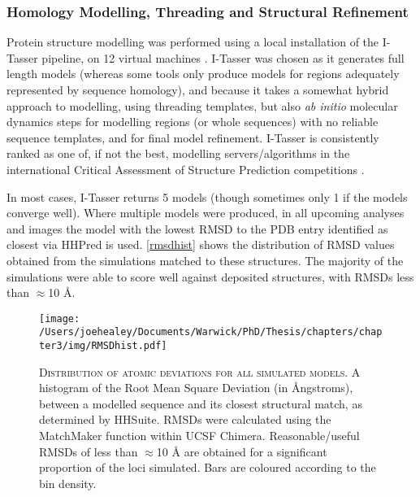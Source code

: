 \subsubsection{Homology Modelling, Threading and Structural Refinement}
Protein structure modelling was performed using a local installation of the I-Tasser pipeline, on 12 virtual machines \citep{Yang2014, Roy2010, Zhang2008}. I-Tasser was chosen as it generates full length models (whereas some tools only produce models for regions adequately represented by sequence homology), and because it takes a somewhat hybrid approach to modelling, using threading templates, but also \emph{ab initio} molecular dynamics steps for modelling regions (or whole sequences) with no reliable sequence templates, and for final model refinement. I-Tasser is consistently ranked as one of, if not the best, modelling servers/algorithms in the international Critical Assessment of Structure Prediction competitions \citep{Moult2015}.

In most cases, I-Tasser returns 5 models (though sometimes only 1 if the models converge well). Where multiple models were produced, in all upcoming analyses and images the model with the lowest RMSD to the PDB entry identified as closest via HHPred is used. \vref{rmsdhist} shows the distribution of RMSD values obtained from the simulations matched to these structures. The majority of the simulations were able to score well against deposited structures, with RMSDs less than $\approx$10 \AA.

\begin{figure}[h]
\centering
{}
\texttt{[image: /Users/joehealey/Documents/Warwick/PhD/Thesis/chapters/chapter3/img/RMSDhist.pdf]}
	\captionsetup{singlelinecheck=off, justification=justified, font=footnotesize, aboveskip=10pt}
	\caption[I-Tasser model accuracy distribution - RMSD]{\textsc{\normalsize Distribution of atomic deviations for all simulated models.}\vspace{0.1cm} \newline A histogram of the Root Mean Square Deviation (in \AA{}ngstroms), between a modelled sequence and its closest structural match, as determined by HHSuite. RMSDs were calculated using the MatchMaker function within UCSF Chimera. Reasonable/useful RMSDs of less than $\approx$10 \AA{} are obtained for a significant proportion of the loci simulated. Bars are coloured according to the bin density.}
	\label{rmsdhist}
\end{figure}


